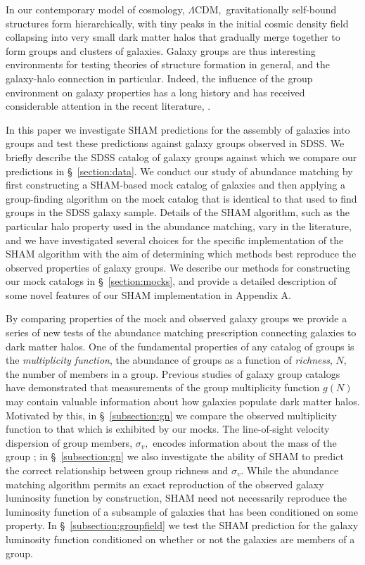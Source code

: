 \documentclass[usenatbib,usegraphicx,letterpaper]{mn2e}
\newcommand{\lcdm}{\Lambda\mathrm{CDM}}
\begin{document}
In our contemporary model of cosmology, $\lcdm,$ gravitationally
self-bound structures form hierarchically, with tiny peaks in the
initial cosmic density field collapsing into very small dark matter
halos that gradually merge together to form groups and clusters of
galaxies. Galaxy groups are thus interesting environments for testing
theories of structure formation in general, and the galaxy-halo
connection in particular. Indeed, the influence of the group
environment on galaxy properties has a long history and has 
received considerable attention in the recent literature,
\cite[e.g.,][]{yang_etal05,zandivarez_etal06,robotham_etal06,yang_etal08,yang_etal09,tinker_etal11a,gerke_etal12}. 

In this paper we investigate SHAM predictions for the assembly of
galaxies into groups and test these predictions against galaxy groups
observed in SDSS. We briefly describe the SDSS catalog of galaxy
groups against which we compare our predictions in
\S~\ref{section:data}. We conduct our study of abundance matching by
first constructing a SHAM-based mock catalog of galaxies and then
applying a group-finding algorithm on the mock catalog that is identical 
to that used to find groups in the SDSS galaxy sample. Details of the SHAM
algorithm, such as the particular halo property used in the abundance
matching, vary in the literature, and we have investigated several
choices for the specific implementation of the SHAM algorithm with the
aim of determining which methods best reproduce the observed
properties of galaxy groups. We describe our methods for constructing
our mock catalogs in \S~\ref{section:mocks}, and provide a detailed
description of some novel features of our SHAM implementation in
Appendix A. 

By comparing properties of the mock and observed galaxy groups we
provide a series of new tests of the abundance matching prescription
connecting galaxies to dark matter halos. One of the fundamental
properties of any catalog of groups is the {\em multiplicity
function}, the abundance of groups as a function of {\em richness},
$N,$ the number of members in a group. Previous studies of galaxy
group catalogs \citep{berlind_etal06,vale_ostriker06} have
demonstrated that measurements of the group multiplicity function
$g(N)$ may contain valuable information about how galaxies populate
dark matter halos. Motivated by this, in \S~\ref{subsection:gn} we
compare the observed multiplicity function to that which is exhibited
by our mocks. The line-of-sight velocity dispersion of group members,
$\sigma_v,$ encodes information about the mass of the group
\cite[e.g.,][]{becker_etal07}; in \S~\ref{subsection:gn} we also
investigate the ability of SHAM to predict the correct relationship
between group richness and $\sigma_v.$ While the abundance matching
algorithm permits an exact reproduction of the observed galaxy
luminosity function by construction, SHAM need not necessarily
reproduce the luminosity function of a subsample of galaxies that has
been conditioned on some property. In \S~\ref{subsection:groupfield}
we test the SHAM prediction for the galaxy luminosity function
conditioned on whether or not the galaxies are members of a group.
\end{document}
